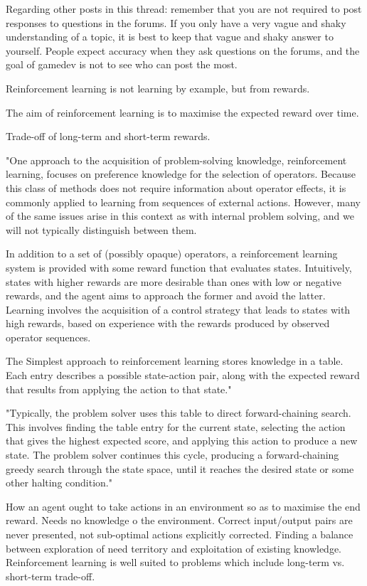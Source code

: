 \documentclass[a4paper,oneside]{report}
\begin{document}
Regarding other posts in this thread: remember that you are not required to post responses to questions in the forums. If you only have a very vague and shaky understanding of a topic, it is best to keep that vague and shaky answer to yourself. People expect accuracy when they ask questions on the forums, and the goal of gamedev is not to see who can post the most. 

Reinforcement learning is not learning by example, but from rewards.
 
The aim of reinforcement learning is to maximise the expected reward over time. 

Trade-off of long-term and short-term rewards. 

"One approach to the acquisition of problem-solving knowledge, reinforcement learning, focuses on preference knowledge for the selection of operators. Because this class of methods does not require information about operator effects, it is commonly applied to learning from sequences of external actions. However, many of the same issues arise in this context as with internal problem solving, and we will not typically distinguish between them.

In addition to a set of (possibly opaque) operators, a reinforcement learning system is provided with some reward function that evaluates states. Intuitively, states with higher rewards are more desirable than ones with low or negative rewards, and the agent aims to approach the former and avoid the latter. Learning involves the acquisition of a control strategy that leads to states with high rewards, based on experience with the rewards produced by observed operator sequences.

The Simplest approach to reinforcement learning stores knowledge in a table. Each entry describes a possible state-action pair, along with the expected reward that results from applying the action to that state."

"Typically, the problem solver uses this table to direct forward-chaining search. This involves finding the table entry for the current state, selecting the action that gives the highest expected score, and applying this action to produce a new state. The problem solver continues this cycle, producing a forward-chaining greedy search through the state space, until it reaches the desired state or some other halting condition."

How an agent ought to take actions in an environment so as to maximise the end reward. Needs no knowledge o the environment. Correct input/output pairs are never presented, not sub-optimal actions explicitly corrected. Finding a balance between exploration of need territory and exploitation of existing knowledge. Reinforcement learning is well suited to problems which include long-term vs. short-term trade-off. 
\end{document}
